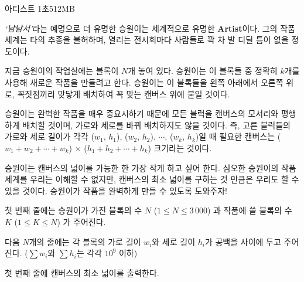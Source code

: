 \begin{problem}{아티스트}
{}{}
{1초}{512MB}{}

\textit{`남남서'}라는 예명으로 더 유명한 승원이는 세계적으로 유명한 \textbf{Artist}이다. 그의 작품 세계는 타의 추종을 불허하며, 열리는 전시회마다 사람들로 꽉 차 발 디딜 틈이 없을 정도이다.

지금 승원이의 작업실에는 블록이 $N$개 놓여 있다. 승원이는 이 블록들 중 정확히 $k$개를 사용해 새로운 작품을 만들려고 한다. 승원이는 이 블록들을 왼쪽 아래에서 오른쪽 위로, 꼭짓점끼리 맞닿게 배치하여 꼭 맞는 캔버스 위에 붙일 것이다.

승원이는 완벽한 작품을 매우 중요시하기 때문에 모든 블럭을 캔버스의 모서리와 평행하게 배치할 것이며, 가로와 세로를 바꿔 배치하지도 않을 것이다. 즉, 고른 블럭들의 가로와 세로 길이가 각각 ($w_1$, $h_1$), ($w_2$, $h_2$), $\cdots$, ($w_k$, $h_k$)일 때 필요한 캔버스는 ($w_1 + w_2 + \cdots + w_k$) $\times$ ($h_1 + h_2 + \cdots + h_k$) 크기라는 것이다. 

승원이는 캔버스의 넓이를 가능한 한 가장 작게 하고 싶어 한다. 심오한 승원이의 작품 세계를 우리는 이해할 수 없지만, 캔버스의 최소 넓이를 구하는 것 만큼은 우리도 할 수 있을 것이다. 승원이가 작품을 완벽하게 만들 수 있도록 도와주자!

\InputFile

첫 번째 줄에는 승원이가 가진 블록의 수 $N$ ($1 \le N \le 3\, 000$) 과 작품에 쓸 블록의 수 $K$ ($1 \le K \le N $) 가 주어진다.

다음 $N$개의 줄에는 각 블록의 가로 길이 $w_i$와 세로 길이 $h_i$가 공백을 사이에 두고 주어진다. ($\sum w_i$와 $\sum h_i$는 각각 $10^9$ 이하)

\OutputFile

첫 번째 줄에 캔버스의 최소 넓이를 출력한다.

\Examples
	
\begin{example}
%
\end{example} 

\blankpage

\end{problem}
